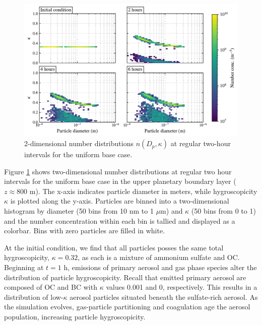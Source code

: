 \begin{figure}[!t]
  \centering
    \includegraphics[width=\textwidth]{figures/chapter5/2d-kappa-dist-4-panel-uniform-basecase-z40.pdf}
    \caption{2-dimensional number distributions $n(D_p, \kappa)$ at regular two-hour intervals for the uniform base case.}
    \label{fig:2d-kappa-dist-ub}
\end{figure}

Figure \ref{fig:2d-kappa-dist-ub} shows two-dimensional number distributions at regular two hour intervals for the uniform base case in the upper planetary boundary layer ($z\approx800$ m). The x-axis indicates particle diameter in meters, while hygroscopicity $\kappa$ is plotted along the y-axis. Particles are binned into a two-dimensional histogram by diameter (50 bins from 10 nm to 1 $\mu$m) and $\kappa$ (50 bins from 0 to 1) and the number concentration within each bin is tallied and displayed as a colorbar. Bins with zero particles are filled in white.

At the initial condition, we find that all particles posses the same total hygroscopicity, $\kappa=0.32$, as each is a mixture of ammonium sulfate and OC. Beginning at $t=1$ h, emissions of primary aerosol and gas phase species alter the distribution of particle hygroscopicity. Recall that emitted primary aerosol are composed of OC and BC with $\kappa$ values 0.001 and 0, respectively. This results in a distribution of low-$\kappa$ aerosol particles situated beneath the sulfate-rich aerosol. As the simulation evolves, gas-particle partitioning and coagulation age the aerosol population, increasing particle hygroscopicity.

